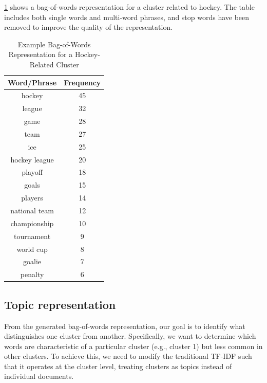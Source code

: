\cref{tab:hockey_cluster} shows a bag-of-words representation for a cluster related to hockey. The table includes both single words and multi-word phrases, and stop words have been removed to improve the quality of the representation.


\begin{table}[h]
    \centering
    \begin{tabular}{|c|c|}
        \hline
        \textbf{Word/Phrase} & \textbf{Frequency} \\
        \hline
        hockey               & 45                 \\
        league               & 32                 \\
        game                 & 28                 \\
        team                 & 27                 \\
        ice                  & 25                 \\
        hockey league        & 20                 \\
        playoff              & 18                 \\
        goals                & 15                 \\
        players              & 14                 \\
        national team        & 12                 \\
        championship         & 10                 \\
        tournament           & 9                  \\
        world cup            & 8                  \\
        goalie               & 7                  \\
        penalty              & 6                  \\
        \hline
    \end{tabular}
    \caption{Example Bag-of-Words Representation for a Hockey-Related Cluster}
    \label{tab:hockey_cluster}
\end{table}

\subsection{Topic representation}
From the generated bag-of-words representation, our goal is to identify what distinguishes one cluster from another. Specifically, we want to determine which words are characteristic of a particular cluster (e.g., cluster 1) but less common in other clusters. To achieve this, we need to modify the traditional TF-IDF such that it operates at the cluster level, treating clusters as topics instead of individual documents.

